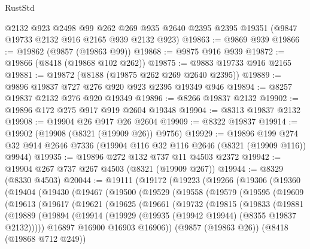 \begin{lexlean}{RustStd}
\begin{coremodule}
    @2132
    @923
    @2498
    @99
    @262
    @269
    @935
    @2640
    @2395
    @2395
    @19351
    (@9847 @19733 @2132 @916 @2165 @939 @2132 @923)
@19863 := @9869 @939
@19866 := @19862 (@9857 (@19863 @99))
@19868 := @9875 @916 @939
@19872 := @19866 (@8418 (@19868 @102 @262))
@19875 := @9883 @19733 @916 @2165
@19881 := @19872 (@8188 (@19875 @262 @269 @2640 @2395))
@19889 := @9896 @19837 @727 @276 @920 @923 @2395 @19349 @946
@19894 := @8257 @19837 @2132 @276 @920 @19349
@19896 := @8266 @19837 @2132
@19902 := @19896 @172 @275 @917 @919 @2604 @19348
@19904 := @8313 @19837 @2132
@19908 := @19904 @26 @917 @26 @2604
@19909 := @8322 @19837
@19914 := @19902 (@19908 (@8321 (@19909 @26)) @9756)
@19929 := @19896
    @199
    @274
    @32
    @914
    @2646
    @7336
    (@19904 @116 @32 @116 @2646 (@8321 (@19909 @116)) @9944)
@19935 := @19896 @272 @132 @737 @11 @4503 @2372
@19942 := @19904 @267 @737 @267 @4503 (@8321 (@19909 @267))
@19944 := @8329 (@8330 @4503)
@20044 := @19111
    (@19172
      (@19223
        (@19266
          (@19306
            (@19360
              (@19404
                (@19430
                  (@19467
                    (@19500
                      (@19529
                        (@19558
                          (@19579
                            (@19595
                              (@19609
                                (@19613
                                  (@19617
                                    (@19621
                                      (@19625
                                        (@19661
                                          (@19732
                                            (@19815
                                              (@19833
                                                (@19881
                                                  (@19889
                                                    (@19894
                                                      (@19914
                                                        (@19929
                                                          (@19935
                                                            (@19942 @19944)
                                                            (@8355 @19837 @2132)))))
                                                    @16897
                                                    @16900
                                                    @16903
                                                    @16906))
                                                (@9857 (@19863 @26))
                                                (@8418 (@19868 @712 @249))

\end{coremodule}
\end{lexlean}
